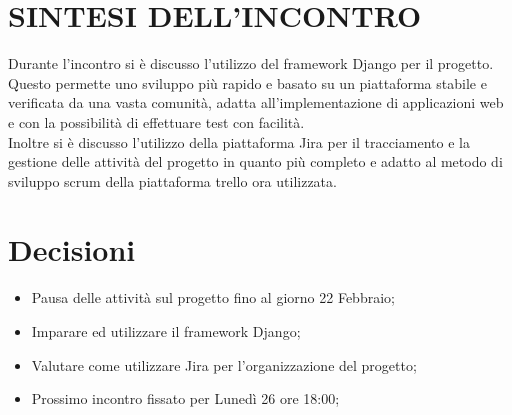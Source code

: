 \documentclass[5pt]{article}
\begin{document}
\section{SINTESI DELL'INCONTRO}

Durante l'incontro si è discusso l'utilizzo del framework Django per il progetto. Questo permette uno sviluppo più rapido e basato su un piattaforma stabile e verificata da una vasta comunità, adatta all'implementazione di applicazioni web e con la possibilità di effettuare test con facilità. \\
Inoltre si è discusso l'utilizzo della piattaforma Jira per il tracciamento e la gestione delle attività del progetto in quanto più completo e adatto al metodo di sviluppo scrum della piattaforma trello ora utilizzata.


\section{Decisioni}
\begin{itemize}
	\item Pausa delle attività sul progetto fino al giorno 22 Febbraio;
	\item Imparare ed utilizzare il framework Django;
	\item Valutare come utilizzare Jira per l'organizzazione del progetto;
	\item Prossimo incontro fissato per Lunedì 26 ore 18:00;
\end{itemize}

\end{document}
